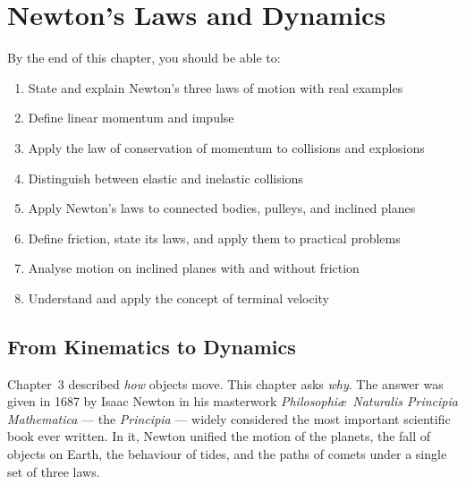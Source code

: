 %

\chapter{Newton's Laws and Dynamics}
\label{ch:dynamics}


\begin{objectivebox}
By the end of this chapter, you should be able to:
\begin{enumerate}[noitemsep]
  \item State and explain Newton's three laws of motion
  with real examples
  \item Define linear momentum and impulse
  \item Apply the law of conservation of momentum to
  collisions and explosions
  \item Distinguish between elastic and inelastic
  collisions
  \item Apply Newton's laws to connected bodies, pulleys,
  and inclined planes
  \item Define friction, state its laws, and apply them
  to practical problems
  \item Analyse motion on inclined planes with and
  without friction
  \item Understand and apply the concept of terminal
  velocity
\end{enumerate}
\end{objectivebox}

\vspace{0.4cm}

\minitoc

\vspace{0.5cm}

\section{From Kinematics to Dynamics}

Chapter~3 described \textit{how} objects move. This
chapter asks \textit{why}. The answer was given in 1687
by Isaac Newton in his masterwork
\textit{Philosophi\ae\ Naturalis Principia Mathematica}
--- the \textit{Principia} --- widely considered the most
important scientific book ever written. In it, Newton
unified the motion of the planets, the fall of objects
on Earth, the behaviour of tides, and the paths of
comets under a single set of three laws.

